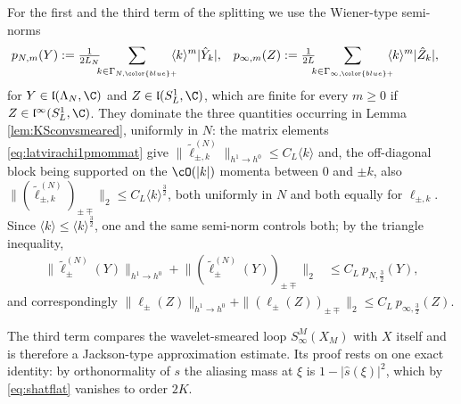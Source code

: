 \documentclass[a4paper, 11pt]{article}
\newcommand{\fl}{\mathfrak{l}}\newcommand{\cl}{\mathcal{l}}
\DeclareMathOperator{\1}{\mathds{1}}
\begin{document}
For the first and the third term of the splitting we use the Wiener-type semi-norms
\begin{align}
\label{eq:loopseminorms}
p_{N,m}(Y) & := \tfrac{1}{2L_{N}}\!\!\!\sum_{k\in\Gamma_{N,{\color{blue}+}}}\!\!\!\langle k\rangle^{m}|\hat{Y}_{k}|, & p_{\infty,m}(Z) & := \tfrac{1}{2L}\!\!\!\sum_{k\in\Gamma_{\infty,{\color{blue}+}}}\!\!\!\langle k\rangle^{m}|\hat{Z}_{k}|,
\end{align}
for $Y\in\fl(\Lambda_{N},\C)$ and $Z\in\fl(S^{1}_{L},\C)$, which are finite for every $m\geq0$ if $Z\in\fl^{\infty}(S^{1}_{L},\C)$. They dominate the three quantities occurring in Lemma \ref{lem:KSconvsmeared}, uniformly in $N$: the matrix elements \eqref{eq:latvirachi1pmommat} give $\|\tilde{\ell}^{(N)}_{\pm,k}\|_{h^{1}\rightarrow h^{0}}\leq C_{L}\langle k\rangle$ and, the off-diagonal block being supported on the $\cO(|k|)$ momenta between $0$ and $\pm k$, also $\|(\tilde{\ell}^{(N)}_{\pm,k})_{\pm\mp}\|_{2}\leq C_{L}\langle k\rangle^{\frac{3}{2}}$, both uniformly in $N$ and both equally for $\ell_{\pm,k}$. Since $\langle k\rangle\leq\langle k\rangle^{\frac{3}{2}}$, one and the same semi-norm controls both; by the triangle inequality,
\begin{align}
\label{eq:loopseminormbound}
\big\|\tilde{\ell}^{(N)}_{\pm}(Y)\big\|_{h^{1}\rightarrow h^{0}}+\big\|(\tilde{\ell}^{(N)}_{\pm}(Y))_{\pm\mp}\big\|_{2} & \leq C_{L}\!\ p_{N,\frac{3}{2}}(Y),
\end{align}
and correspondingly $\|\ell_{\pm}(Z)\|_{h^{1}\rightarrow h^{0}}+\|(\ell_{\pm}(Z))_{\pm\mp}\|_{2}\leq C_{L}\!\ p_{\infty,\frac{3}{2}}(Z)$.

The third term compares the wavelet-smeared loop $S^{M}_{\infty}(X_{M})$ with $X$ itself and is therefore a Jackson-type approximation estimate. Its proof rests on one exact identity: by orthonormality of $s$ the aliasing mass at $\xi$ is $1-|\hat{s}(\xi)|^{2}$, which by \eqref{eq:shatflat} vanishes to order $2K$.
\end{document}
